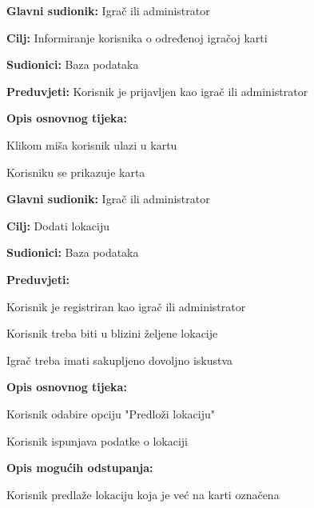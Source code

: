 \noindent {}
\begin{packed_item}
	\item \textbf{Glavni sudionik: } Igrač ili administrator
	\item  \textbf{Cilj:} Informiranje korisnika o određenoj igračoj karti
	\item  \textbf{Sudionici:} Baza podataka
    \item \textbf{Preduvjeti:} Korisnik je prijavljen kao igrač ili administrator
	\item  \textbf{Opis osnovnog tijeka:} 
    \item[] \begin{packed_enum}
        \item Klikom miša korisnik ulazi u kartu
        \item Korisniku se prikazuje karta
    \end{packed_enum}
\end{packed_item}

\noindent {}
\begin{packed_item}
	\item \textbf{Glavni sudionik: } Igrač ili administrator
	\item  \textbf{Cilj:} Dodati lokaciju
	\item  \textbf{Sudionici:} Baza podataka
    \item \textbf{Preduvjeti:}
	\item[]  \begin{packed_enum}
	    \item Korisnik je registriran kao igrač ili administrator
        \item Korisnik treba biti u blizini željene lokacije
        \item Igrač treba imati sakupljeno dovoljno iskustva 
	\end{packed_enum}
	\item  \textbf{Opis osnovnog tijeka:}
	\item[] \begin{packed_enum}
	\item Korisnik odabire opciju "Predloži lokaciju"
	\item Korisnik ispunjava podatke o lokaciji
	\end{packed_enum}
	\item  \textbf{Opis mogućih odstupanja:}
	\item[] \begin{packed_enum}
	    \item Korisnik predlaže lokaciju koja je već na karti označena 
	\end{packed_enum}
\end{packed_item}

